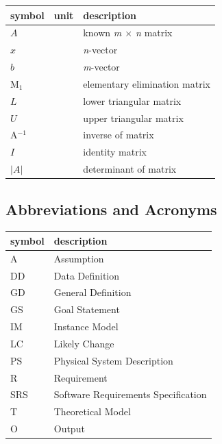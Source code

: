 \documentclass[12pt]{article}
\begin{document}
\renewcommand{\arraystretch}{1.2}
\noindent \begin{longtable*}{l l p{12cm}} \toprule
\textbf{symbol} & \textbf{unit} & \textbf{description}\\
\midrule


$A$ & \text{-} & known \textit{m $\times$ n} matrix \\
$x$ & \text{-} & \textit{n}-vector\\
$b$ & \text{-} & \textit{m}-vector\\
M$_{1}$ & \text{-} & elementary elimination matrix\\
$L$ & \text{-} & lower triangular matrix\\
$U$ & \text{-} & upper triangular matrix\\ 
A$^{-1}$ & \text{-} & inverse of matrix \\
$I$ & \text{-} & identity matrix\\
{${|A|}$} & \text{-} & determinant of matrix\\ 

\bottomrule
\end{longtable*}


\subsection{Abbreviations and Acronyms}

\renewcommand{\arraystretch}{1.2}
\begin{tabular}{l l} 
  \toprule		
  \textbf{symbol} & \textbf{description}\\
  \midrule 
  A & Assumption\\
  DD & Data Definition\\
  GD & General Definition\\
  GS & Goal Statement\\
  IM & Instance Model\\
  LC & Likely Change\\
  PS & Physical System Description\\
  R & Requirement\\
  SRS & Software Requirements Specification\\

  T & Theoretical Model\\
  O & Output\\
  \bottomrule
\end{tabular}\\
\end{document}
